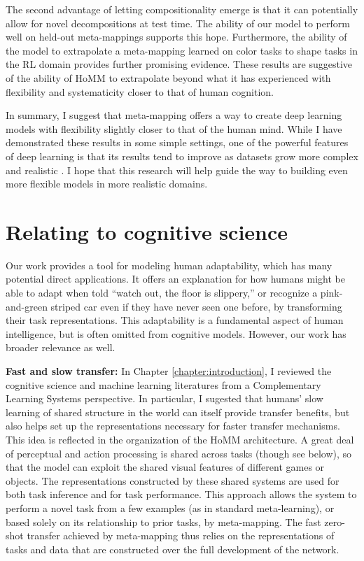 The second advantage of letting compositionality emerge is that it can potentially allow for novel decompositions at test time. The ability of our model to perform well on held-out meta-mappings supports this hope. Furthermore, the ability of the model to extrapolate a meta-mapping learned on color tasks to shape tasks in the RL domain provides further promising evidence. These results are suggestive of the ability of HoMM to extrapolate beyond what it has experienced with flexibility and systematicity closer to that of human cognition.\par

In summary, I suggest that meta-mapping offers a way to create deep learning models with flexibility slightly closer to that of the human mind. While I have demonstrated these results in some simple settings, one of the powerful features of deep learning is that its results tend to improve as datasets grow more complex and realistic \citep{Hill2019a,Radford2019,Sutton2019}. I hope that this research will help guide the way to building even more flexible models in more realistic domains. \par

\section{Relating to cognitive science}

Our work provides a tool for modeling human adaptability, which has many potential direct applications. It offers an explanation for how humans might be able to adapt when told ``watch out, the floor is slippery,'' or recognize a pink-and-green striped car even if they have never seen one before, by transforming their task representations. This adaptability is a fundamental aspect of human intelligence, but is often omitted from cognitive models. However, our work has broader relevance as well. \par 

\textbf{Fast and slow transfer:} In Chapter \ref{chapter:introduction}, I reviewed the cognitive science and machine learning literatures from a Complementary Learning Systems perspective. In particular, I sugested that humans' slow learning of shared structure in the world can itself provide transfer benefits, but also helps set up the representations necessary for faster transfer mechanisms. This idea is reflected in the organization of the HoMM architecture. A great deal of perceptual and action processing is shared across tasks (though see below), so that the model can exploit the shared visual features of different games or objects. The representations constructed by these shared systems are used for both task inference and for task performance. This approach allows the system to perform a novel task from a few examples (as in standard meta-learning), or based solely on its relationship to prior tasks, by meta-mapping. The fast zero-shot transfer achieved by meta-mapping thus relies on the representations of tasks and data that are constructed over the full development of the network. \par

